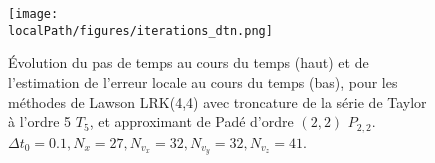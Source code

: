 \begin{figure}[h]
  \centering
  \texttt{[image: \\localPath/figures/iterations\_dtn.png]}
  \caption{Évolution du pas de temps au cours du temps (haut) et de l'estimation de l'erreur locale au cours du temps (bas), pour les méthodes de Lawson LRK(4,4) avec troncature de la série de Taylor à l'ordre 5 $T_5$, et approximant de Padé d'ordre $(2,2)$ $P_{2,2}$. $\Delta t_0 = 0.1, N_x=27, N_{v_x}=32, N_{v_y}=32, N_{v_z}=41$.}
  \label{fig:approx:iterations:dtn}
\end{figure}
